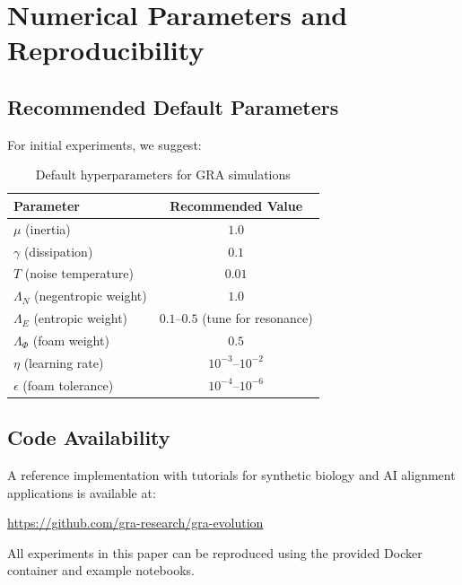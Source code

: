 \documentclass[11pt,a4paper]{article}
\theoremstyle{plain}
\theoremstyle{definition}
\theoremstyle{remark}
\begin{document}
\section{Numerical Parameters and Reproducibility}
\label{app:reproducibility}

\subsection{Recommended Default Parameters}

For initial experiments, we suggest:
\begin{table}[H]
\centering
\caption{Default hyperparameters for GRA simulations}
\label{tab:defaults}
\begin{tabular}{lc}
\toprule
Parameter & Recommended Value \\
\midrule
$\mu$ (inertia) & $1.0$ \\
$\gamma$ (dissipation) & $0.1$ \\
$T$ (noise temperature) & $0.01$ \\
$\Lambda_N$ (negentropic weight) & $1.0$ \\
$\Lambda_E$ (entropic weight) & $0.1$--$0.5$ (tune for resonance) \\
$\Lambda_\Phi$ (foam weight) & $0.5$ \\
$\eta$ (learning rate) & $10^{-3}$--$10^{-2}$ \\
$\epsilon$ (foam tolerance) & $10^{-4}$--$10^{-6}$ \\
\bottomrule
\end{tabular}
\end{table}

\subsection{Code Availability}

A reference implementation with tutorials for synthetic biology and AI alignment applications is available at:
\begin{center}
\url{https://github.com/gra-research/gra-evolution}
\end{center}
All experiments in this paper can be reproduced using the provided Docker container and example notebooks.
\end{document}
